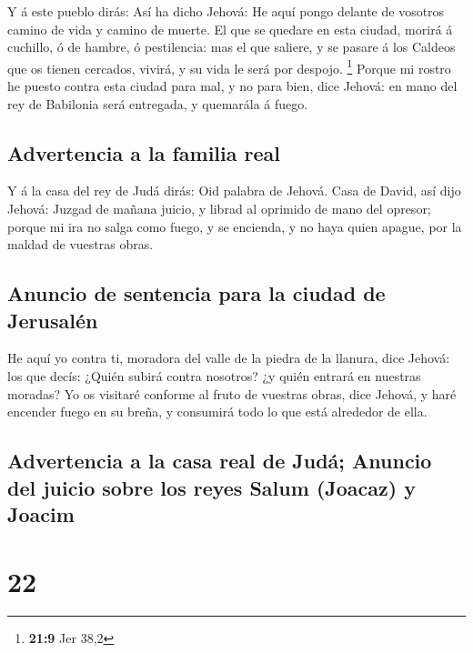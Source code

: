  Y á este pueblo dirás: Así ha dicho Jehová: He aquí pongo
delante de vosotros camino de vida y camino de muerte.  El
que se quedare en esta ciudad, morirá á cuchillo, ó de hambre, ó
pestilencia: mas el que saliere, y se pasare á los Caldeos que os tienen
cercados, vivirá, y su vida le será por despojo. \footnote{\textbf{21:9}
  Jer 38,2}  Porque mi rostro he puesto contra esta
ciudad para mal, y no para bien, dice Jehová: en mano del rey de
Babilonia será entregada, y quemarála á fuego.

\hypertarget{advertencia-a-la-familia-real}{%
\subsection{Advertencia a la familia
real}\label{advertencia-a-la-familia-real}}

 Y á la casa del rey de Judá dirás: Oid palabra de
Jehová.  Casa de David, así dijo Jehová: Juzgad de mañana
juicio, y librad al oprimido de mano del opresor; porque mi ira no salga
como fuego, y se encienda, y no haya quien apague, por la maldad de
vuestras obras.

\hypertarget{anuncio-de-sentencia-para-la-ciudad-de-jerusaluxe9n}{%
\subsection{Anuncio de sentencia para la ciudad de
Jerusalén}\label{anuncio-de-sentencia-para-la-ciudad-de-jerusaluxe9n}}

 He aquí yo contra ti, moradora del valle de la piedra de
la llanura, dice Jehová: los que decís: ¿Quién subirá contra nosotros?
¿y quién entrará en nuestras moradas?  Yo os visitaré
conforme al fruto de vuestras obras, dice Jehová, y haré encender fuego
en su breña, y consumirá todo lo que está alrededor de ella.

\hypertarget{advertencia-a-la-casa-real-de-juduxe1-anuncio-del-juicio-sobre-los-reyes-salum-joacaz-y-joacim}{%
\subsection{Advertencia a la casa real de Judá; Anuncio del juicio sobre
los reyes Salum (Joacaz) y
Joacim}\label{advertencia-a-la-casa-real-de-juduxe1-anuncio-del-juicio-sobre-los-reyes-salum-joacaz-y-joacim}}

\hypertarget{section-21}{%
\section{22}\label{section-21}}

